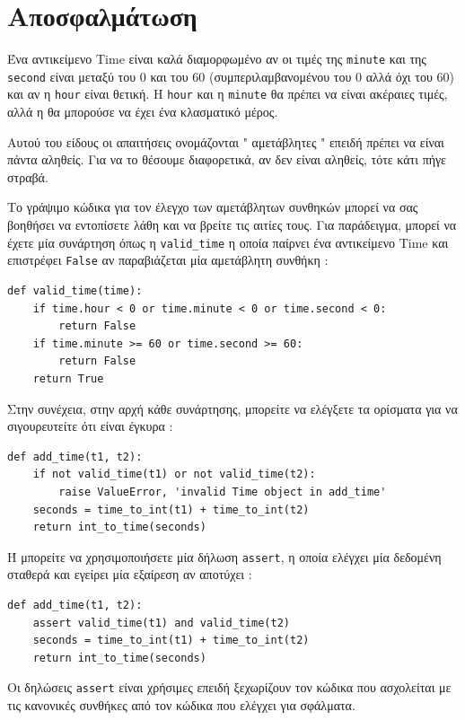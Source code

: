 \documentclass[10pt]{book}
\begin{document}
\section{Αποσφαλμάτωση}

Ένα αντικείμενο  Time  είναι καλά διαμορφωμένο αν οι τιμές της  {\tt minute}  και της  {\tt second}  είναι 
μεταξύ του 0 και του 60 (συμπεριλαμβανομένου του 0 αλλά όχι του 60) και αν η  {\tt hour}  είναι θετική.  Η  {\tt hour}  και η  {\tt minute}  θα πρέπει να είναι ακέραιες τιμές, αλλά η θα μπορούσε να έχει ένα κλασματικό μέρος.

Αυτού του είδους οι απαιτήσεις ονομάζονται  " αμετάβλητες "  επειδή πρέπει να είναι πάντα αληθείς.  Για να το θέσουμε διαφορετικά, αν δεν είναι αληθείς, τότε κάτι πήγε στραβά.

Το γράψιμο κώδικα για τον έλεγχο των αμετάβλητων συνθηκών μπορεί να σας βοηθήσει να εντοπίσετε λάθη και να βρείτε τις αιτίες 
τους.  Για παράδειγμα, μπορεί να έχετε μία συνάρτηση όπως η  \verb"valid_time"  η οποία παίρνει ένα αντικείμενο  Time  και επιστρέφει  {\tt False}  αν παραβιάζεται μία αμετάβλητη συνθήκη :

\begin{verbatim}
def valid_time(time):
    if time.hour < 0 or time.minute < 0 or time.second < 0:
        return False
    if time.minute >= 60 or time.second >= 60:
        return False
    return True
\end{verbatim}
%
 Στην συνέχεια, στην αρχή κάθε συνάρτησης, μπορείτε να ελέγξετε τα ορίσματα για να σιγουρευτείτε ότι είναι έγκυρα :

\begin{verbatim}
def add_time(t1, t2):
    if not valid_time(t1) or not valid_time(t2):
        raise ValueError, 'invalid Time object in add_time'
    seconds = time_to_int(t1) + time_to_int(t2)
    return int_to_time(seconds)
\end{verbatim}
%
 Ή μπορείτε να χρησιμοποιήσετε μία δήλωση  {\tt assert},  η οποία ελέγχει μία δεδομένη σταθερά και εγείρει μία 
εξαίρεση αν αποτύχει :

\begin{verbatim}
def add_time(t1, t2):
    assert valid_time(t1) and valid_time(t2)
    seconds = time_to_int(t1) + time_to_int(t2)
    return int_to_time(seconds)
\end{verbatim}
%
 Οι δηλώσεις  {\tt assert}  είναι χρήσιμες επειδή ξεχωρίζουν τον κώδικα που ασχολείται με τις κανονικές συνθήκες 
από τον κώδικα που ελέγχει για σφάλματα.
\end{document}
